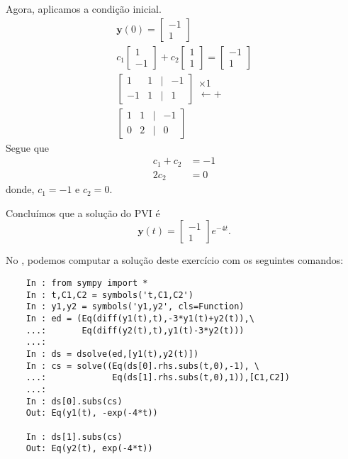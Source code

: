 \begin{resol}
  Agora, aplicamos a condição inicial.
  \begin{gather}
    \pmb{y}(0) =
    \begin{bmatrix}
      -1 \\
      1
    \end{bmatrix}\\
    c_1 \begin{bmatrix}
      1 \\
      -1
    \end{bmatrix} + c_2 \begin{bmatrix}
      1 \\
      1
    \end{bmatrix} =     \begin{bmatrix}
      -1 \\
      1
    \end{bmatrix} \\
    \begin{bmatrix}
      1 & 1 & | & -1 \\
      -1 & 1 & | & 1
    \end{bmatrix}
    \begin{matrix}
      \times 1 \\
      \leftarrow +
    \end{matrix}\\
    \begin{bmatrix}
      1 & 1 & | & -1 \\
      0 & 2 & | & 0
    \end{bmatrix}
  \end{gather}
  Segue que
  \begin{align}
    c_1 + c_2 &= -1\\
    2c_2 &= 0
  \end{align}
  donde, $c_1=-1$ e $c_2 = 0$.

  Concluímos que a solução do PVI é
  \begin{equation}
    \pmb{y}(t) =
    \begin{bmatrix}
      -1 \\
      1
    \end{bmatrix}e^{-4t}.
  \end{equation}

  \ifispython
  No \python, podemos computar a solução deste exercício com os seguintes comandos:
  \begin{lstlisting}
    In : from sympy import *
    In : t,C1,C2 = symbols('t,C1,C2')
    In : y1,y2 = symbols('y1,y2', cls=Function)
    In : ed = (Eq(diff(y1(t),t),-3*y1(t)+y2(t)),\
    ...:       Eq(diff(y2(t),t),y1(t)-3*y2(t)))
    ...: 
    In : ds = dsolve(ed,[y1(t),y2(t)])
    In : cs = solve((Eq(ds[0].rhs.subs(t,0),-1), \
    ...:             Eq(ds[1].rhs.subs(t,0),1)),[C1,C2])
    ...: 
    In : ds[0].subs(cs)
    Out: Eq(y1(t), -exp(-4*t))

    In : ds[1].subs(cs)
    Out: Eq(y2(t), exp(-4*t))
  \end{lstlisting}
  \fi
\end{resol}

